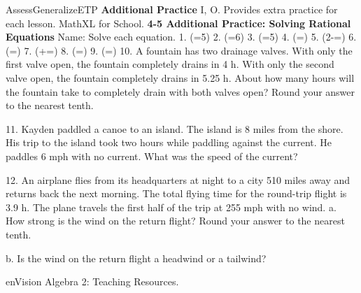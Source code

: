 \documentclass{article}
\newenvironment{te-addendum}[2]{}{}     %
\newcommand{\answer}[1]{}               %
\begin{document}
\begin{te-addendum}{Assess}{GeneralizeETP}
\textbf{Additional Practice} I, O. Provides extra practice for each lesson. MathXL for School.
\textbf{4-5 Additional Practice: Solving Rational Equations}
Name: \underline{\hspace{3cm}}
Solve each equation.
1. (=5) \answer{(x=-\frac{19}{5})}
2. (=6) \answer{(x=\frac{19}{6})}
3. (=5) \answer{(x=-\frac{9}{5})}
4. (=) \answer{(x=2)}
5. (2-=) \answer{(x=-2)}
6. (=) \answer{(x=9)}
7. (+=) \answer{no solutions}
8. (=) \answer{(x=2)}
9. (=) \answer{(x=10)}
10. A fountain has two drainage valves. With only the first valve open, the fountain completely drains in 4 h. With only the second valve open, the fountain completely drains in 5.25 h. About how many hours will the fountain take to completely drain with both valves open? Round your answer to the nearest tenth.
\answer{2.3 hours}
11. Kayden paddled a canoe to an island. The island is 8 miles from the shore. His trip to the island took two hours while paddling against the current. He paddles 6 mph with no current. What was the speed of the current?
\answer{2 mph}
12. An airplane flies from its headquarters at night to a city 510 miles away and returns back the next morning. The total flying time for the round-trip flight is 3.9 h. The plane travels the first half of the trip at 255 mph with no wind.
a. How strong is the wind on the return flight? Round your answer to the nearest tenth.
\answer{13.4 mph}
b. Is the wind on the return flight a headwind or a tailwind?
\answer{A tailwind, because the trip is faster on the way back to headquarters.}
enVision Algebra 2: Teaching Resources.
\end{te-addendum}
\end{document}
